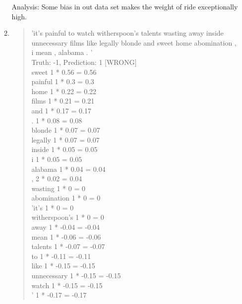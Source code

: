 \documentclass[12pt]{article}
\begin{document}
\begin{enumerate}[label=(\alph*)]
\begin{enumerate}[label=\arabic*.]
\begin{quote}
      \end{quote}
    Analysis: Some bias in out data set makes the weight of ride exceptionally high.
    \item
      \begin{quote}
        'it's painful to watch witherspoon's talents wasting away inside unnecessary films like legally blonde and sweet home abomination , i mean , alabama . ' \\
Truth: -1, Prediction: 1 [WRONG] \\
sweet                         1 * 0.56 = 0.56 \\
painful                       1 * 0.3 = 0.3 \\
home                          1 * 0.22 = 0.22 \\
films                         1 * 0.21 = 0.21 \\
and                           1 * 0.17 = 0.17 \\
.                             1 * 0.08 = 0.08 \\ 
blonde                        1 * 0.07 = 0.07 \\
legally                       1 * 0.07 = 0.07 \\
inside                        1 * 0.05 = 0.05 \\ 
i                             1 * 0.05 = 0.05 \\
alabama                       1 * 0.04 = 0.04 \\ 
,                             2 * 0.02 = 0.04 \\
wasting                       1 * 0 = 0 \\
abomination                   1 * 0 = 0 \\
'it's                         1 * 0 = 0 \\
witherspoon's                 1 * 0 = 0 \\
away                          1 * -0.04 = -0.04 \\
mean                          1 * -0.06 = -0.06 \\
talents                       1 * -0.07 = -0.07 \\ 
to                            1 * -0.11 = -0.11 \\
like                          1 * -0.15 = -0.15 \\
unnecessary                   1 * -0.15 = -0.15 \\
watch                         1 * -0.15 = -0.15 \\
'                             1 * -0.17 = -0.17

\end{quote}
\end{enumerate}
\end{enumerate}
\end{document}

